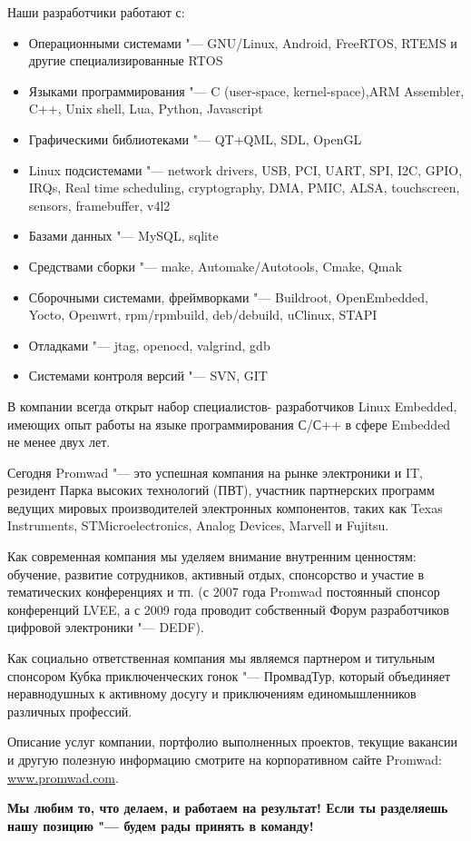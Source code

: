 \documentclass[10pt, a5paper]{article}
\begin{document}
Наши разработчики работают с:
\begin{itemize}
\item Операционными системами "--- GNU/Linux, Android, FreeRTOS, RTEMS и другие специализированные RTOS
\item Языками программирования "--- C (user-space, kernel-space),\linebreak ARM Assembler, C++, Unix shell, Lua, Python, Javascript
\item Графическими библиотеками "--- QT+QML, SDL, OpenGL
\item Linux подсистемами "--- network drivers, USB, PCI, UART, SPI, I2C, GPIO, IRQs, Real time scheduling, cryptography, DMA, PMIC, ALSA, touchscreen, sensors, framebuffer, v4l2
\item Базами данных "--- MySQL, sqlite
\item Средствами сборки "--- make, Automake/Autotools, Cmake, \linebreak Qmak
\item Сборочными системами, фреймворками "--- Buildroot, \linebreak OpenEmbedded, Yocto, Openwrt, rpm/rpmbuild, deb/debuild, uClinux, STAPI
\item Отладками "--- jtag, openocd, valgrind, gdb
\item Системами контроля версий "--- SVN, GIT
\end{itemize}

В компании всегда открыт набор специалистов- разработчиков Linux Embedded, имеющих опыт работы  на языке программирования С/С++  в сфере Embedded не менее двух лет.

Сегодня Promwad "--- это успешная компания на рынке электроники и IT, резидент Парка высоких технологий (ПВТ), участник партнерских программ ведущих мировых производителей электронных компонентов, таких как Texas Instruments, STMicroelectronics, Analog Devices, Marvell и Fujitsu. 

Как современная компания мы уделяем внимание внутренним ценностям: обучение, развитие сотрудников, активный отдых, спонсорство и участие в тематических конференциях и тп. (с 2007 года Promwad постоянный спонсор конференций LVEE, а с 2009 года проводит собственный Форум разработчиков цифровой электроники "--- DEDF).

Как социально ответственная компания мы являемся партнером и титульным спонсором Кубка приключенческих гонок "--- ПромвадТур, который объединяет неравнодушных к активному досугу и приключениям единомышленников различных профессий. 

Описание услуг  компании, портфолио выполненных проектов, текущие вакансии и другую полезную информацию смотрите на корпоративном сайте Promwad: \url{www.promwad.com}.

{\bf Мы любим то, что делаем, и работаем на результат! Если ты разделяешь нашу позицию "--- будем рады принять в команду!}
\end{document}
